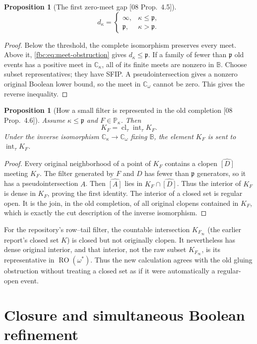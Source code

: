 \documentclass[11pt,letterpaper]{article}
\newtheorem{proposition}[theorem]{Proposition}
\theoremstyle{definition}
\theoremstyle{remark}
\newcommand{\om}{\omega}
\newcommand{\B}{\mathbb B}
\newcommand{\C}{\mathbb C}
\newcommand{\PP}{\mathbb P}
\newcommand{\cp}{\mathfrak p}
\newcommand{\RO}{\operatorname{RO}}
\newcommand{\Int}{\operatorname{int}}
\newcommand{\Cl}{\operatorname{cl}}
\newcommand{\src}[1]{\textup{[#1]}}
\begin{document}
\begin{proposition}[The first zero-meet gap \src{08 Prop.~4.5}]
\label{fbc:prop:arity}
\[
 d_\kappa=\begin{cases}
 \infty,&\kappa\leq\cp,\\
 \cp,&\kappa>\cp.
 \end{cases}
\]
\end{proposition}
\begin{proof}
Below the threshold, the complete isomorphism preserves every meet.
Above it, \eqref{fbc:eq:meet-obstruction} gives $d_\kappa\leq\cp$.
If a family of fewer than $\cp$ old events has a positive meet in
$\C_\kappa$, all of its finite meets are nonzero in $\B$. Choose
subset representatives; they have SFIP. A pseudointersection gives
a nonzero original Boolean lower bound, so the meet in $\C_\om$
cannot be zero. This gives the reverse inequality.
\end{proof}

\begin{proposition}[How a small filter is represented in the old completion \src{08 Prop.~4.6}]
\label{fbc:prop:interior}
Assume $\kappa\leq\cp$ and $F\in\PP_\kappa$. Then
\[
 K_F=\Cl_\tau\Int_\tau K_F.
\]
Under the inverse isomorphism $\C_\kappa\to\C_\om$ fixing $\B$,
the element $K_F$ is sent to $\Int_\tau K_F$.
\end{proposition}
\begin{proof}
Every original neighborhood of a point of $K_F$ contains a clopen
$\widehat{[D]}$ meeting $K_F$. The filter generated by $F$ and $D$
has fewer than $\cp$ generators, so it has a pseudointersection $A$.
Then $\widehat{[A]}$ lies in $K_F\cap\widehat{[D]}$. Thus the
interior of $K_F$ is dense in $K_F$, proving the first identity.
The interior of a closed set is regular open. It is the join, in the
old completion, of all original clopens contained in $K_F$, which
is exactly the cut description of the inverse isomorphism.
\end{proof}

For the repository's row--tail filter, the countable intersection
$K_{F_\infty}$ (the earlier report's closed set $K$) is closed but not
originally clopen. It nevertheless has dense original interior, and that
interior, not the raw subset $K_{F_\infty}$, is its representative in
$\RO(\om^*)$. Thus the new calculation agrees with the old gluing
obstruction without treating a closed set as if it were automatically a
regular-open event.

\section{Closure and simultaneous Boolean refinement}
\label{fbc:sec:closure}
\end{document}
